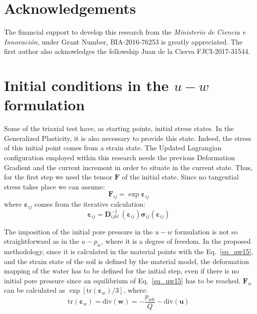 \documentclass[preprint,12pt,a4paper]{elsarticle}
\begin{document}
\section*{Acknowledgements}
The  financial support to develop this research from the \textit{Ministerio de Ciencia e Innovaci\'on}, under Grant Number, BIA-2016-76253 is greatly appreciated. The first author also acknowledges the fellowship Juan de la Cierva FJCI-2017-31544.

\appendix

\clearpage
{}
\section{Initial conditions in the $u-w$ formulation}
\label{ap:1}
Some of the triaxial test have, as starting points, initial stress states. In the Generalized Plasticity, it is also necessary to provide this state. Indeed, the stress of this initial point comes from a strain state. The Updated Lagrangian configuration employed within this research needs the previous Deformation Gradient and the current increment in order to situate in the current state. Thus, for the first step we need the tensor $\boldsymbol{F}$ of the initial state. Since no tangential stress takes place we can assume:
\begin{equation}
    \boldsymbol{F}_{ij}=\exp{\boldsymbol{\varepsilon}_{ij}}
\end{equation}
where $\boldsymbol{\varepsilon}_{ij}$ comes from the iterative calculation:
\begin{equation}
    \boldsymbol{\varepsilon}_{ij}=\boldsymbol{D}^{-1}_{ijkl}\:(\boldsymbol{\varepsilon}_{ij})\boldsymbol{\sigma}_{ij}(\boldsymbol{\varepsilon}_{ij})
\end{equation}

The imposition of the initial pore pressure in the $u-w$ formulation is not so straightforward as in the $u-p_w$, where it is a degree of freedom. In the proposed methodology, since it is calculated in the material points with the Eq.~\eqref{eq_uw15}, and the strain state of the soil is defined by the material model, the deformation mapping of the water has to be defined for the initial step, even if there is no initial pore pressure since an equilibrium of Eq.~\eqref{eq_uw15} has to be reached. $\boldsymbol{F}_w$ can be calculated as $\exp{\left[\text{tr}\left(\boldsymbol{\varepsilon}_{w}\right)/3\right]}$, where:
\begin{equation}
  \text{tr}\left(\boldsymbol{\varepsilon}_{w}\right) = \mbox{div} (\boldsymbol{w}) = -\frac{p_{w0}}{Q} - \mbox{div} (\boldsymbol{u})
\end{equation}
\end{document}
